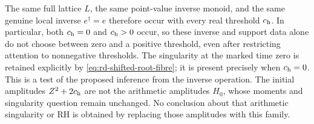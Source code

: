 The same full lattice $L$, the same point-value inverse monoid,
and the same genuine local inverse $e^\dagger=e$ therefore occur
with every real threshold $c_{\rm h}$. In particular, both
$c_{\rm h}=0$ and $c_{\rm h}>0$ occur, so these inverse and
support data alone do not choose between zero and a positive
threshold, even after restricting attention to nonnegative
thresholds. The singularity at the marked time zero is retained
explicitly by \eqref{eq:rd-shifted-root-fibre}; it is present
precisely when $c_{\rm h}=0$. This is a test of the proposed
inference from the inverse operation. The initial amplitudes
$Z^2+2c_{\rm h}$ are not the arithmetic amplitudes $H_0$, whose
moments and singularity question remain unchanged. No conclusion
about that arithmetic singularity or RH is obtained by replacing
those amplitudes with this family.

